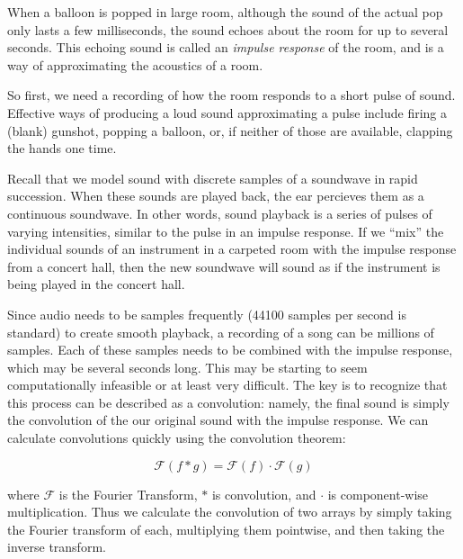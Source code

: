 When a balloon is popped in large room, although the sound of the actual pop only lasts a few milliseconds, the sound echoes about the room for up to several seconds.
This echoing sound is called an \emph{impulse response} of the room, and is a way of approximating the acoustics of a room.

So first, we need a recording of how the room responds to a short pulse of sound.
Effective ways of producing a loud sound approximating a pulse include firing a (blank) gunshot, popping a balloon, or, if neither of those are available, clapping the hands one time.

Recall that we model sound with discrete samples of a soundwave in rapid succession.
When these sounds are played back, the ear percieves them as a continuous soundwave.
In other words, sound playback is a series of pulses of varying intensities, similar to the pulse in an impulse response.
If we ``mix'' the individual sounds of an instrument in a carpeted room with the impulse response from a concert hall, then the new soundwave will sound as if the instrument is being played in the concert hall.

Since audio needs to be samples frequently (44100 samples per second is standard) to create smooth playback, a recording of a song can be millions of samples.
Each of these samples needs to be combined with the impulse response, which may be several seconds long.
This may be starting to seem computationally infeasible or at least very difficult.
The key is to recognize that this process can be described as a convolution: namely, the final sound is simply the convolution of the our original sound with the impulse response.
We can calculate convolutions quickly using the convolution theorem:

\[\mathcal{F}(f \ast g) = \mathcal{F}(f)\cdot\mathcal{F}(g)\]

where $\mathcal{F}$ is the Fourier Transform, $\ast$ is convolution, and $\cdot$ is component-wise multiplication.
Thus we calculate the convolution of two arrays by simply taking the Fourier transform of each, multiplying them pointwise, and then taking the inverse transform.

